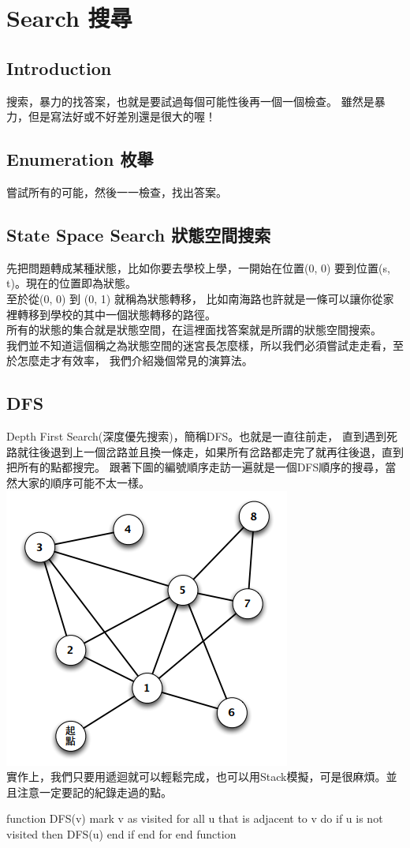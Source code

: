 \documentclass{article}
\begin{document}
\section{Search 搜尋}
\subsection*{Introduction}
搜索，暴力的找答案，也就是要試過每個可能性後再一個一個檢查。
雖然是暴力，但是寫法好或不好差別還是很大的喔！

\subsection{Enumeration 枚舉}
嘗試所有的可能，然後一一檢查，找出答案。

\subsection{State Space Search 狀態空間搜索}
先把問題轉成某種狀態，比如你要去學校上學，一開始在位置(0, 0) 要到位置(s, t)。現在的位置即為狀態。\\
至於從(0, 0) 到 (0, 1) 就稱為狀態轉移，
比如南海路也許就是一條可以讓你從家裡轉移到學校的其中一個狀態轉移的路徑。\\
所有的狀態的集合就是狀態空間，在這裡面找答案就是所謂的狀態空間搜索。\\
我們並不知道這個稱之為狀態空間的迷宮長怎麼樣，所以我們必須嘗試走走看，至於怎麼走才有效率，
我們介紹幾個常見的演算法。

\subsection{DFS}
Depth First Search(深度優先搜索)，簡稱DFS。也就是一直往前走，
直到遇到死路就往後退到上一個岔路並且換一條走，如果所有岔路都走完了就再往後退，直到把所有的點都搜完。
跟著下圖的編號順序走訪一遍就是一個DFS順序的搜尋，當然大家的順序可能不太一樣。\\
\includegraphics[width=0.5\columnwidth]{DFS.png}\\
實作上，我們只要用遞迴就可以輕鬆完成，也可以用Stack模擬，可是很麻煩。並且注意一定要記的紀錄走過的點。
\begin{algorithm}[caption={DFS}, label={alg1}]
function DFS(v)
    mark v as visited
    for all u that is adjacent to v do
        if u is not visited then
            DFS(u)
        end if
    end for
end function
\end{algorithm}
\end{document}
